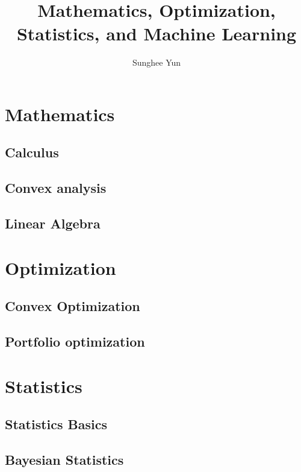 \documentclass[10pt, twoside]{book}   	%
\title{Mathematics, Optimization, Statistics, and Machine Learning}
\author{Sunghee Yun}
\begin{document}
\maketitle

\setcounter{secnumdepth}{4}
\setcounter{tocdepth}{3}
\tableofcontents


\part{Mathematics}

\chapter{Calculus}


\chapter{Convex analysis}


\chapter{Linear Algebra}



\part{Optimization}

\chapter{Convex Optimization}


\chapter{Portfolio optimization}



\part{Statistics}
%

\chapter{Statistics Basics}


\chapter{Bayesian Statistics}

\end{document}
